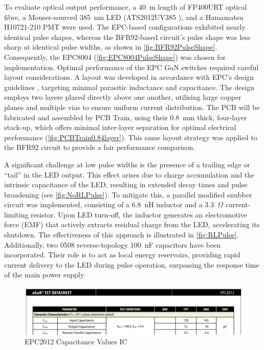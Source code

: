 \documentclass[a4paper,11pt]{article}
\begin{document}
To evaluate optical output performance, a 40~m length of FP400URT \cite{FP400URT} optical fibre, a Mouser-sourced 385~nm LED (ATS2012UV385 \cite{ATS2012UV385}), and a Hamamatsu H10721-210 \cite{H10721-210} PMT were used. The EPC-based configurations exhibited nearly identical pulse shapes, whereas the BFR92-based circuit's pulse shape was less sharp at identical pulse widths, as shown in \cref{fig:BFR92PulseShape}. Consequently, the EPC8004 (\cref{fig:EPC8004PulseShape}) was chosen for implementation. Optimal performance of the EPC GaN switches required careful layout considerations. A layout was developed in accordance with EPC's design guidelines \cite{EPCHSGuide}, targeting minimal parasitic inductance and capacitance. The design employs two layers placed directly above one another, utilising large copper planes and multiple vias to ensure uniform current distribution. The PCB will be fabricated and assembled by PCB Train, using their 0.8~mm thick, four-layer stack-up, which offers minimal inter-layer separation for optimal electrical performance (\cref{fig:PCBTrain0.84layer}). This same layout strategy was applied to the BFR92 circuit to provide a fair performance comparison.

A significant challenge at low pulse widths is the presence of a trailing edge or “tail” in the LED output. This effect arises due to charge accumulation and the intrinsic capacitance of the LED, resulting in extended decay times and pulse broadening (see \cref{fig:NoRLPulse}). To mitigate this, a parallel modified snubber circuit was implemented, consisting of a 6.8~nH inductor and a 3.3~$\Omega$ current-limiting resistor. Upon LED turn-off, the inductor generates an electromotive force (EMF) that actively extracts residual charge from the LED, accelerating its shutdown. The effectiveness of this approach is illustrated in \cref{fig:RLPulse}.
Additionally, two 0508 reverse-topology 100~nF capacitors have been incorporated. Their role is to act as local energy reservoirs, providing rapid current delivery to the LED during pulse operation, surpassing the response time of the main power supply.

\begin{figure}[htbp]
\centering
\includegraphics[scale=0.8]{EPC2012Cap.png}
\caption{EPC2012 Capacitance Values IC\label{fig:EPC2012Cap}}
\end{figure}
\end{document}

